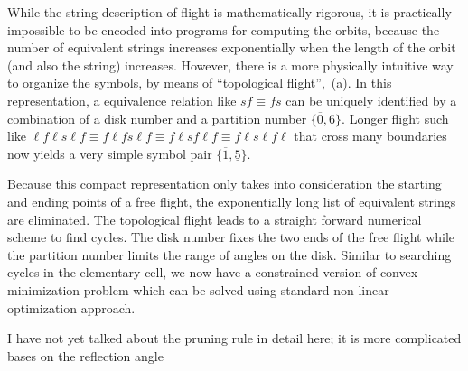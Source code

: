 While the string description of flight is mathematically rigorous, it
is practically impossible to be encoded into programs for computing
the orbits, because the number of equivalent strings increases
exponentially when the length of the orbit (and also the string)
increases. However, there is a more physically intuitive way to
organize the symbols, by means of ``topological flight'',
\,(a). In this representation, a equivalence
relation like $sf\equiv fs$ can be uniquely identified by a
combination of a disk number and a partition number
$\{\overline{0},\underline{6}\}$. Longer flight such like $\ell f \ell
s \ell f \equiv  f \ell f s \ell f \equiv f \ell s f \ell f \equiv f
\ell s \ell f \ell$ that cross many boundaries now yields a very
simple symbol pair $\{\overline{1},\underline{5}\}$.

Because this compact representation only takes into consideration the
starting and ending points of a free flight, the exponentially long
list of equivalent strings are eliminated. The topological flight
leads to a straight forward numerical scheme to find cycles. The disk
number fixes the two ends of the free flight while the partition
number limits the range of angles on the disk. Similar to searching
cycles in the elementary cell, we now have a constrained version of
convex minimization problem which can be solved using standard
non-linear optimization approach.

    {I have not yet talked about the pruning rule in detail here; it is
    more complicated bases on the reflection angle}
